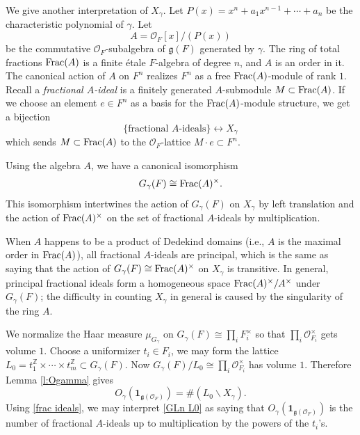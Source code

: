 \documentclass[]{pcmi}
\theoremstyle{plain}
\theoremstyle{definition}
\def\ZZ{\mathbb{Z}}
\def\calO{\mathcal{O}}
\newcommand\frg{\mathfrak{g}}
\newcommand\Frac{\textup{Frac}}
\newcommand{\bij}{\leftrightarrow}
\newcommand{\one}{\mathbf{1}}
\newcommand{\bs}{\backslash}
\begin{document}
We give another interpretation of $X_{\gamma}$. Let $P(x)=x^{n}+a_{1}x^{n-1}+\cdots+a_{n}$ be the characteristic polynomial of $\gamma$. Let
\begin{equation*}
A=\calO_{F}[x]/(P(x))
\end{equation*}
be the commutative $\calO_{F}$-subalgebra of $\frg(F)$ generated by $\gamma$. The ring of total fractions $\Frac(A)$ is a finite \'etale $F$-algebra of degree $n$, and $A$ is an order in it. The canonical action of $A$ on $F^{n}$ realizes $F^{n}$ as a free $\Frac(A)$-module of rank $1$.  Recall a {\em fractional $A$-ideal} is a finitely generated $A$-submodule $M\subset \Frac(A)$. If we choose an element $e\in F^{n}$ as a basis for the $\Frac(A)$-module structure, we get a bijection
\begin{equation}\label{frac ideals}
\{\mbox{fractional $A$-ideals}\}\bij X_{\gamma}
\end{equation}
which sends $M\subset \Frac(A)$ to the $\calO_{F}$-lattice $M\cdot e\subset F^{n}$. 



Using the algebra $A$, we have a canonical isomorphism
\begin{equation*}
G_{\gamma}(F)\cong \Frac(A)^{\times}.
\end{equation*}
This isomorphism intertwines the action of $G_{\gamma}(F)$ on $X_{\gamma}$ by left translation and the action of $\Frac(A)^{\times}$ on the set of fractional $A$-ideals by multiplication. 

When $A$ happens to be a product of Dedekind domains (i.e., $A$ is the maximal order in $\Frac(A)$), all fractional $A$-ideals are principal, which is the same as saying that the action of $G_{\gamma}(F)\cong \Frac(A)^{\times}$ on $X_{\gamma}$ is transitive. In general, principal fractional ideals form a homogeneous space $\Frac(A)^{\times}/A^{\times}$ under $G_{\gamma}(F)$; the difficulty in counting $X_{\gamma}$ in general is caused by the singularity of the ring $A$.


We normalize the Haar measure $\mu_{G_{\gamma}}$ on $G_{\gamma}(F)\cong\prod_{i}F^{\times}_{i}$ so that $\prod_{i}\calO^{\times}_{F_{i}}$ gets volume $1$. Choose a uniformizer $t_{i}\in F_{i}$, we may form the lattice $L_{0}=t^{\ZZ}_{1}\times \cdots\times t^{\ZZ}_{m}\subset G_{\gamma}(F)$. Now $G_{\gamma}(F)/L_{0}\cong \prod_{i}\calO_{F_{i}}^{\times}$ has volume $1$. Therefore Lemma \ref{l:Ogamma} gives
\begin{equation}\label{GLn L0}
O_{\gamma}(\one_{\frg(\calO_{F})})=\#(L_{0}\bs X_{\gamma}).
\end{equation}
Using \eqref{frac ideals}, we may interpret \eqref{GLn L0} as saying that $O_{\gamma}(\one_{\frg(\calO_{F})})$ is the number of fractional $A$-ideals up to multiplication by the powers of the $t_{i}$'s. 
\end{document}

